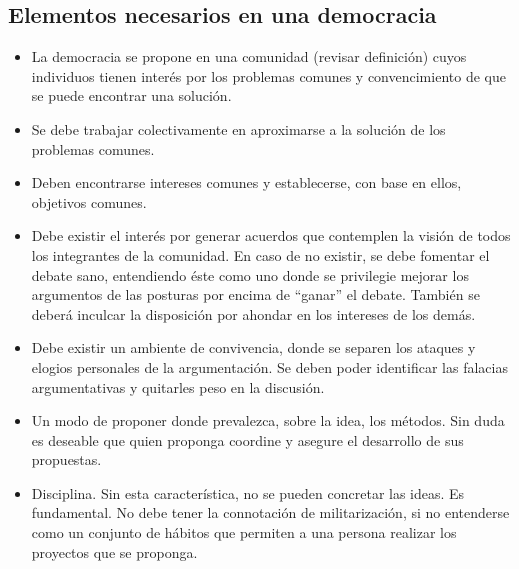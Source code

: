 \documentclass[10pt,letterpaper,oneside]{book}
\begin{document}
		\subsection*{Elementos necesarios en una democracia}	
			\begin{itemize}
			\item La democracia se propone en una comunidad (revisar definición) cuyos individuos tienen interés por los problemas comunes y convencimiento de que se puede encontrar una solución.
			\item Se debe trabajar colectivamente en aproximarse a la solución de los problemas comunes.
			\item Deben encontrarse intereses comunes y establecerse, con base en ellos, objetivos comunes.
			\item Debe existir el interés por generar acuerdos que contemplen la visión de todos los integrantes de la comunidad. En caso de no existir, se debe fomentar el debate sano, entendiendo éste como uno donde se privilegie mejorar los argumentos de las posturas por encima de ``ganar'' el debate. También se deberá inculcar la disposición por ahondar en los intereses de los demás.
			\item Debe existir un ambiente de convivencia, donde se separen los ataques y elogios personales de la argumentación. Se deben poder identificar las falacias argumentativas y quitarles peso en la discusión.
			\item Un modo de proponer donde prevalezca, sobre la idea, los métodos. Sin duda es deseable que quien proponga coordine y asegure el desarrollo de sus propuestas.
			\item Disciplina. Sin esta característica, no se pueden concretar las ideas. Es fundamental. No debe tener la connotación de militarización, si no entenderse como un conjunto de hábitos que permiten a una persona realizar los proyectos que se proponga.
			\end{itemize}
	\vspace{-0.3cm}	
\end{document}
